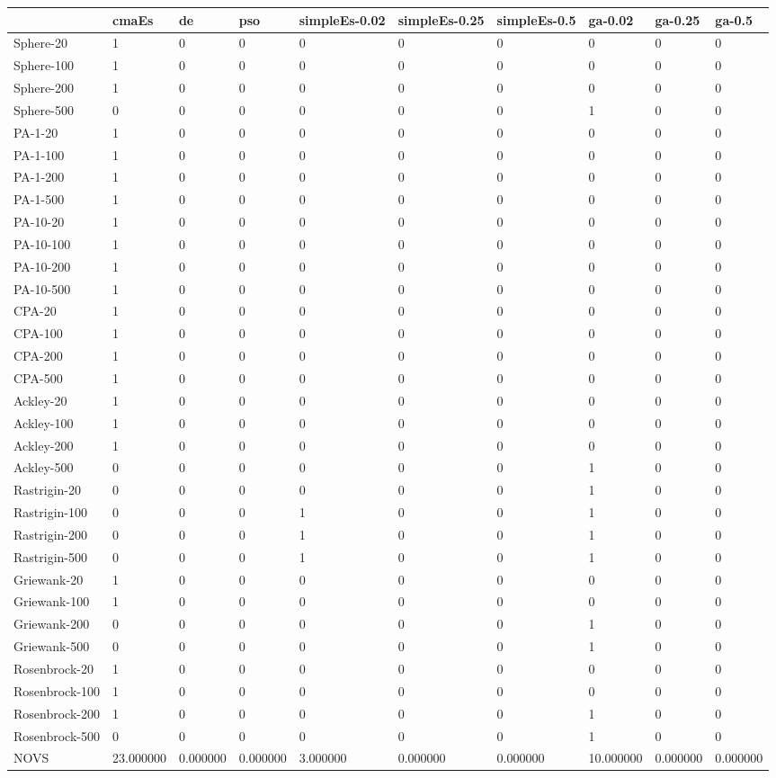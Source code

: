 \begin{tabular}{llllllllll}
\toprule
 & cmaEs & de & pso & simpleEs-0.02 & simpleEs-0.25 & simpleEs-0.5 & ga-0.02 & ga-0.25 & ga-0.5 \\
\midrule
Sphere-20 & 1 & 0 & 0 & 0 & 0 & 0 & 0 & 0 & 0 \\
Sphere-100 & 1 & 0 & 0 & 0 & 0 & 0 & 0 & 0 & 0 \\
Sphere-200 & 1 & 0 & 0 & 0 & 0 & 0 & 0 & 0 & 0 \\
Sphere-500 & 0 & 0 & 0 & 0 & 0 & 0 & 1 & 0 & 0 \\
PA-1-20 & 1 & 0 & 0 & 0 & 0 & 0 & 0 & 0 & 0 \\
PA-1-100 & 1 & 0 & 0 & 0 & 0 & 0 & 0 & 0 & 0 \\
PA-1-200 & 1 & 0 & 0 & 0 & 0 & 0 & 0 & 0 & 0 \\
PA-1-500 & 1 & 0 & 0 & 0 & 0 & 0 & 0 & 0 & 0 \\
PA-10-20 & 1 & 0 & 0 & 0 & 0 & 0 & 0 & 0 & 0 \\
PA-10-100 & 1 & 0 & 0 & 0 & 0 & 0 & 0 & 0 & 0 \\
PA-10-200 & 1 & 0 & 0 & 0 & 0 & 0 & 0 & 0 & 0 \\
PA-10-500 & 1 & 0 & 0 & 0 & 0 & 0 & 0 & 0 & 0 \\
CPA-20 & 1 & 0 & 0 & 0 & 0 & 0 & 0 & 0 & 0 \\
CPA-100 & 1 & 0 & 0 & 0 & 0 & 0 & 0 & 0 & 0 \\
CPA-200 & 1 & 0 & 0 & 0 & 0 & 0 & 0 & 0 & 0 \\
CPA-500 & 1 & 0 & 0 & 0 & 0 & 0 & 0 & 0 & 0 \\
Ackley-20 & 1 & 0 & 0 & 0 & 0 & 0 & 0 & 0 & 0 \\
Ackley-100 & 1 & 0 & 0 & 0 & 0 & 0 & 0 & 0 & 0 \\
Ackley-200 & 1 & 0 & 0 & 0 & 0 & 0 & 0 & 0 & 0 \\
Ackley-500 & 0 & 0 & 0 & 0 & 0 & 0 & 1 & 0 & 0 \\
Rastrigin-20 & 0 & 0 & 0 & 0 & 0 & 0 & 1 & 0 & 0 \\
Rastrigin-100 & 0 & 0 & 0 & 1 & 0 & 0 & 1 & 0 & 0 \\
Rastrigin-200 & 0 & 0 & 0 & 1 & 0 & 0 & 1 & 0 & 0 \\
Rastrigin-500 & 0 & 0 & 0 & 1 & 0 & 0 & 1 & 0 & 0 \\
Griewank-20 & 1 & 0 & 0 & 0 & 0 & 0 & 0 & 0 & 0 \\
Griewank-100 & 1 & 0 & 0 & 0 & 0 & 0 & 0 & 0 & 0 \\
Griewank-200 & 0 & 0 & 0 & 0 & 0 & 0 & 1 & 0 & 0 \\
Griewank-500 & 0 & 0 & 0 & 0 & 0 & 0 & 1 & 0 & 0 \\
Rosenbrock-20 & 1 & 0 & 0 & 0 & 0 & 0 & 0 & 0 & 0 \\
Rosenbrock-100 & 1 & 0 & 0 & 0 & 0 & 0 & 0 & 0 & 0 \\
Rosenbrock-200 & 1 & 0 & 0 & 0 & 0 & 0 & 1 & 0 & 0 \\
Rosenbrock-500 & 0 & 0 & 0 & 0 & 0 & 0 & 1 & 0 & 0 \\
NOVS & 23.000000 & 0.000000 & 0.000000 & 3.000000 & 0.000000 & 0.000000 & 10.000000 & 0.000000 & 0.000000 \\
\bottomrule
\end{tabular}
